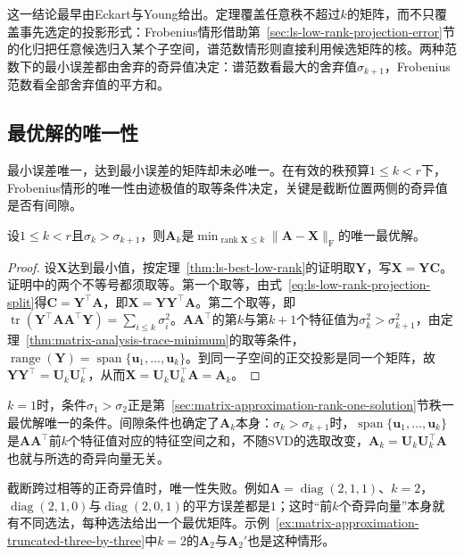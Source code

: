 这一结论最早由Eckart与Young给出。定理覆盖任意秩不超过$k$的矩阵，而不只覆盖事先选定的投影形式：Frobenius情形借助第~\ref{sec:ls-low-rank-projection-error}节的化归把任意候选归入某个子空间，谱范数情形则直接利用候选矩阵的核。两种范数下的最小误差都由舍弃的奇异值决定：谱范数看最大的舍弃值$\sigma_{k+1}$，Frobenius范数看全部舍弃值的平方和。

\subsection{最优解的唯一性}
\label{sec:matrix-approximation-low-rank-uniqueness}

最小误差唯一，达到最小误差的矩阵却未必唯一。在有效的秩预算$1\leq k<r$下，Frobenius情形的唯一性由迹极值的取等条件决定，关键是截断位置两侧的奇异值是否有间隙。

\begin{theorem}[Frobenius最佳逼近的唯一性]
\label{thm:ls-best-low-rank-uniqueness}
设$1\leq k<r$且$\sigma_k>\sigma_{k+1}$，则$\bm A_k$是$\min_{\operatorname{rank}\bm X\leq k}\lVert\bm A-\bm X\rVert_{\mathrm F}$的唯一最优解。
\end{theorem}
\begin{proof}
设$\bm X$达到最小值，按定理~\ref{thm:ls-best-low-rank}的证明取$\bm Y$，写$\bm X=\bm Y\bm C$。证明中的两个不等号都须取等。第一个取等，由式~\eqref{eq:ls-low-rank-projection-split}得$\bm C=\bm Y^\top\bm A$，即$\bm X=\bm Y\bm Y^\top\bm A$。第二个取等，即$\operatorname{tr}(\bm Y^\top\bm A\bm A^\top\bm Y)=\sum_{i\leq k}\sigma_i^2$。$\bm A\bm A^\top$的第$k$与第$k+1$个特征值为$\sigma_k^2>\sigma_{k+1}^2$，由定理~\ref{thm:matrix-analysis-trace-minimum}的取等条件，$\operatorname{range}(\bm Y)=\operatorname{span}\{\bm u_1,\ldots,\bm u_k\}$。到同一子空间的正交投影是同一个矩阵，故$\bm Y\bm Y^\top=\bm U_k\bm U_k^\top$，从而$\bm X=\bm U_k\bm U_k^\top\bm A=\bm A_k$。
\end{proof}

$k=1$时，条件$\sigma_1>\sigma_2$正是第~\ref{sec:matrix-approximation-rank-one-solution}节秩一最优解唯一的条件。间隙条件也确定了$\bm A_k$本身：$\sigma_k>\sigma_{k+1}$时，$\operatorname{span}\{\bm u_1,\ldots,\bm u_k\}$是$\bm A\bm A^\top$前$k$个特征值对应的特征空间之和，不随SVD的选取改变，$\bm A_k=\bm U_k\bm U_k^\top\bm A$也就与所选的奇异向量无关。

截断跨过相等的正奇异值时，唯一性失败。例如$\bm A=\operatorname{diag}(2,1,1)$、$k=2$，$\operatorname{diag}(2,1,0)$与$\operatorname{diag}(2,0,1)$的平方误差都是$1$；这时“前$k$个奇异向量”本身就有不同选法，每种选法给出一个最优矩阵。示例~\ref{ex:matrix-approximation-truncated-three-by-three}中$k=2$的$\bm A_2$与$\bm A_2'$也是这种情形。

